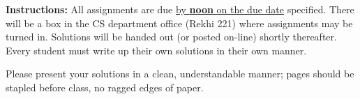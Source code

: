 \documentclass[12pt,addpoints]{exam}
\begin{document}
\extrawidth{0.5in} \extrafootheight{-0in} \pagestyle{headandfoot}
\headrule {} \footrule {}

\noindent \textbf{Instructions:} All assignments are due \underline{by \textbf{noon} on the due date} specified.  There will be a box in the CS department office (Rekhi 221) where assignments may be turned in.  Solutions will be handed out (or posted on-line) shortly thereafter.  Every student
must write up their own solutions in their own manner.

\smallskip
\noindent Please present your solutions in a clean, understandable
manner; pages should be stapled before class, no ragged edges of
paper.
\end{document}
